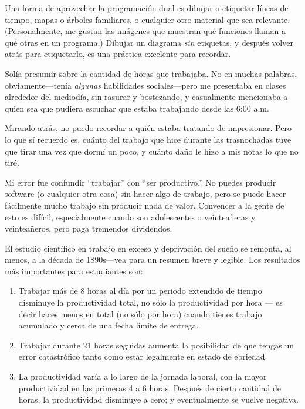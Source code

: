 Una forma de aprovechar la programación dual es dibujar o etiquetar líneas de tiempo,
mapas o árboles familiares,
o cualquier otro material que sea relevante.
(Personalmente, me gustan las imágenes que muestran qué funciones llaman a qué otras en un programa.)
Dibujar un diagrama \emph{sin} etiquetas,
y después volver atrás para etiquetarlo,
es una práctica excelente para recordar.


Solía presumir sobre la cantidad de horas que trabajaba.
No en muchas palabras,
obviamente---tenía \emph{algunas} habilidades sociales---pero
me presentaba en clases alrededor del mediodía,
sin rasurar y bostezando,
y casualmente mencionaba a quien sea que pudiera escuchar
que estaba trabajando desde las 6:00 a.m.

Mirando atrás,
no puedo recordar a quién estaba tratando de impresionar.
Pero lo que sí recuerdo es,
cuánto del trabajo que hice durante las trasnochadas tuve que tirar una vez que dormí un poco,
y cuánto daño le hizo a mis notas lo que no tiré.

Mi error fue confundir ``trabajar'' con ``ser productivo.''
No puedes producir software (o cualquier otra cosa) sin hacer algo de trabajo,
pero se puede hacer fácilmente mucho trabajo sin producir nada de valor.
Convencer a la gente de esto es difícil,
especialmente cuando son adolescentes o veinteañeras y veinteañeros,
pero paga tremendos dividendos.

El estudio científico en trabajo en exceso y deprivación del sueño se remonta, al menos, a la década de 1890s---vea
\cite{Robi2005} para un resumen breve y legible.
Los resultados más importantes para estudiantes son:

\begin{enumerate}

\item
  Trabajar más de 8 horas al día por un periodo extendido de tiempo
  disminuye la productividad total,
  no sólo la productividad por hora --- es decir haces menos en total (no sólo por hora)
  cuando tienes trabajo acumulado y cerca de una fecha límite de entrega.

\item
  Trabajar durante 21 horas seguidas aumenta la posibilidad de que tengas un error catastrófico
  tanto como estar legalmente en estado de ebriedad.

\item
  La productividad varía a lo largo de la jornada laboral,
  con la mayor productividad en las primeras 4 a 6 horas.
  Después de cierta cantidad de horas,
  la productividad disminuye a cero;
  y eventualmente se vuelve negativa.

\end{enumerate}


